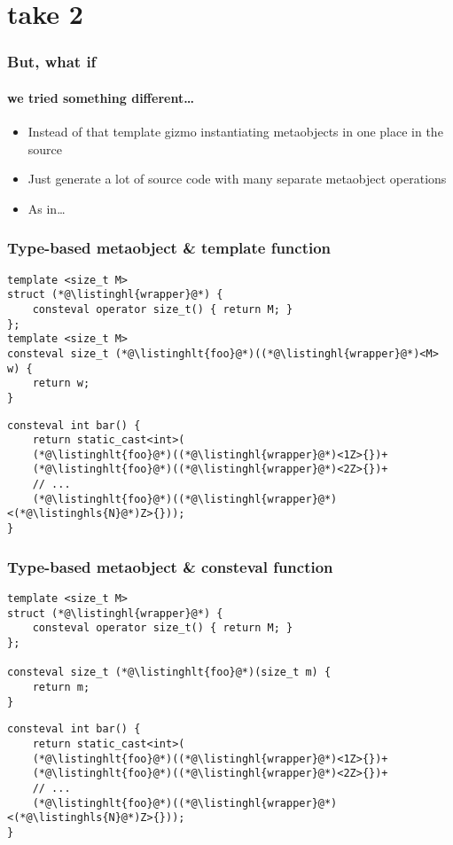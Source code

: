 \documentclass[compress,table,xcolor=table]{beamer}
\begin{document}
\section{take 2}
\begin{frame}
  \frametitle{But, what if}
  \framesubtitle{we tried something different\ldots}
  \Large
  \begin{itemize}
    \item Instead of that template gizmo instantiating metaobjects
      in one place in the source
    \item Just generate a lot of source code with many separate metaobject
      operations
    \item As in\ldots
  \end{itemize}
\end{frame}
\begin{frame}[fragile]
  \frametitle{Type-based metaobject \& template function}
  \begin{lstlisting}[language=c++2x,basicstyle=\small\ttfamily]
template <size_t M>
struct (*@\listinghl{wrapper}@*) {
	consteval operator size_t() { return M; }
};
template <size_t M>
consteval size_t (*@\listinghlt{foo}@*)((*@\listinghl{wrapper}@*)<M> w) {
	return w;
}
  \end{lstlisting}
  \vfill
  \begin{lstlisting}[language=c++2x,basicstyle=\normalsize\ttfamily]
consteval int bar() {
	return static_cast<int>(
    (*@\listinghlt{foo}@*)((*@\listinghl{wrapper}@*)<1Z>{})+
    (*@\listinghlt{foo}@*)((*@\listinghl{wrapper}@*)<2Z>{})+
    // ...
    (*@\listinghlt{foo}@*)((*@\listinghl{wrapper}@*)<(*@\listinghls{N}@*)Z>{}));
}
  \end{lstlisting}
\end{frame}
\begin{frame}[fragile]
  \frametitle{Type-based metaobject \& consteval function}
  \begin{lstlisting}[language=c++2x,basicstyle=\small\ttfamily]
template <size_t M>
struct (*@\listinghl{wrapper}@*) {
	consteval operator size_t() { return M; }
};

consteval size_t (*@\listinghlt{foo}@*)(size_t m) {
	return m;
}
  \end{lstlisting}
  \vfill
  \begin{lstlisting}[language=c++2x,basicstyle=\normalsize\ttfamily]
consteval int bar() {
	return static_cast<int>(
    (*@\listinghlt{foo}@*)((*@\listinghl{wrapper}@*)<1Z>{})+
    (*@\listinghlt{foo}@*)((*@\listinghl{wrapper}@*)<2Z>{})+
    // ...
    (*@\listinghlt{foo}@*)((*@\listinghl{wrapper}@*)<(*@\listinghls{N}@*)Z>{}));
}
  \end{lstlisting}
\end{frame}
\end{document}
